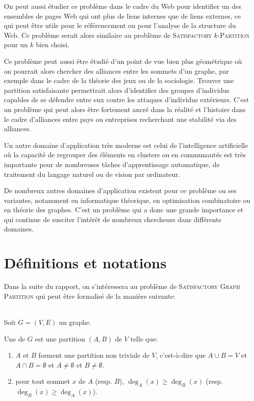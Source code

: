 On peut aussi étudier ce problème dans le cadre du Web pour identifier un des ensembles de pages Web qui ont plus de liens internes que de liens externes, ce qui peut être utile pour le référencement ou pour l'analyse de la structure du Web. Ce problème serait alors similaire au problème de \textsc{Satisfactory} \(k\)-\textsc{Partition} pour un \(k\) bien choisi.

Ce problème peut aussi être étudié d'un point de vue bien plus géométrique où on pourrait alors chercher des alliances entre les sommets d'un graphe, par exemple dans le cadre de la théorie des jeux ou de la sociologie. Trouver une partition satisfaisante permettrait alors d'identifier des groupes d'individus capables de se défendre entre eux contre les attaques d'individus extérieurs. C'est un problème qui peut alors être fortement ancré dans la réalité et l'histoire dans le cadre d'alliances entre pays ou entreprises recherchant une stabilité via des alliances.

Un autre domaine d'application très moderne est celui de l'intelligence artificielle où la capacité de regrouper des éléments en clusters ou en communautés est très importante pour de nombreuses tâches d'apprentissage automatique, de traitement du langage naturel ou de vision par ordinateur. 

De nombreux autres domaines d'application existent pour ce problème ou ses variantes, notamment en informatique théorique, en optimisation combinatoire ou en théorie des graphes. C'est un problème qui a donc une grande importance et qui continue de susciter l'intérêt de nombreux chercheurs dans différents domaines.


\section{Définitions et notations}\label{sec:s_2}

Dans la suite du rapport, on s'intéressera au problème de \textsc{Satisfactory Graph Partition} qui peut être formalisé de la manière suivante:

\begin{definition}\,\\
    Soit \(G = (V, E)\) un graphe.

    Une  de \(G\) est une partition \((A, B)\) de \(V\) telle que:
    \begin{enumerate}[label=\roman*)] %
        \item \(A\) et \(B\) forment une partition non triviale de \(V\), c'est-à-dire que \(A \cup B = V\) et \(A \cap B = \emptyset\) et \(A \neq \emptyset\) et \(B \neq \emptyset\).
        \item pour tout sommet \(x\) de \(A\) (resp. \(B\)), \(\deg_A(x) \geq \deg_B(x)\) (resp.\ \(\deg_B(x) \geq \deg_A(x)\)).
    \end{enumerate}
\end{definition}

